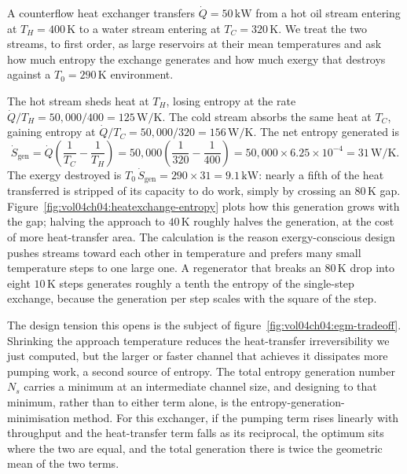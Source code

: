 A counterflow heat exchanger transfers $\dot Q = 50\,\text{kW}$ from a
hot oil stream entering at $T_H = 400\,\si{\kelvin}$ to a water stream
entering at $T_C = 320\,\si{\kelvin}$. We treat the two streams, to first
order, as large reservoirs at their mean temperatures and ask how much
entropy the exchange generates and how much exergy that destroys against
a $T_0 = 290\,\si{\kelvin}$ environment.

The hot stream sheds heat at $T_H$, losing entropy at the rate
$\dot Q/T_H = 50{,}000/400 = 125\,\si{\watt\per\kelvin}$. The cold stream
absorbs the same heat at $T_C$, gaining entropy at $\dot Q/T_C =
50{,}000/320 = 156\,\si{\watt\per\kelvin}$. The net entropy generated is
\[
\dot S_{\text{gen}} = \dot Q\left(\frac{1}{T_C} - \frac{1}{T_H}\right)
= 50{,}000\left(\frac{1}{320} - \frac{1}{400}\right)
= 50{,}000 \times 6.25\times10^{-4}
= 31\,\si{\watt\per\kelvin}.
\]
The exergy destroyed is $T_0\,\dot S_{\text{gen}} = 290 \times 31 =
9.1\,\text{kW}$: nearly a fifth of the heat transferred is stripped of
its capacity to do work, simply by crossing an $80\,\si{\kelvin}$ gap.
Figure~\ref{fig:vol04ch04:heatexchange-entropy} plots how this generation
grows with the gap; halving the approach to $40\,\si{\kelvin}$ roughly
halves the generation, at the cost of more heat-transfer area. The
calculation is the reason exergy-conscious design pushes streams toward
each other in temperature and prefers many small temperature steps to one
large one. A regenerator that breaks an $80\,\si{\kelvin}$ drop into eight
$10\,\si{\kelvin}$ steps generates roughly a tenth the entropy of the
single-step exchange, because the generation per step scales with the
square of the step.

The design tension this opens is the subject of
figure~\ref{fig:vol04ch04:egm-tradeoff}. Shrinking the approach
temperature reduces the heat-transfer irreversibility we just computed,
but the larger or faster channel that achieves it dissipates more pumping
work, a second source of entropy. The total entropy generation number
$N_s$ carries a minimum at an intermediate channel size, and designing to
that minimum, rather than to either term alone, is the
entropy-generation-minimisation method. For this exchanger, if the
pumping term rises linearly with throughput and the heat-transfer term
falls as its reciprocal, the optimum sits where the two are equal, and
the total generation there is twice the geometric mean of the two terms.



